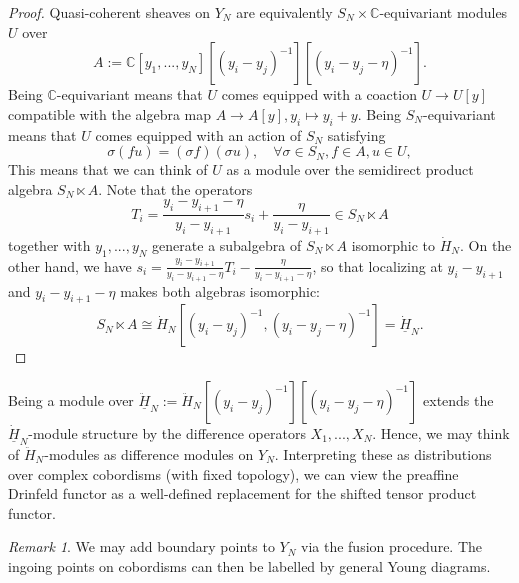 \documentclass[11pt]{report}
\theoremstyle{definition}
\theoremstyle{remark}
\newtheorem*{remark}{Remark}
\theoremstyle{remark}
\newcommand{\C}{\mathbb{C}}
\begin{document}
\begin{proof}
Quasi-coherent sheaves on $Y_N$ are equivalently $S_N \times \C$-equivariant modules $U$ over
\begin{equation*}
A := \C[y_1,...,y_N][(y_i-y_j)^{-1}][(y_i-y_j-\eta)^{-1}].
\end{equation*}
Being $\C$-equivariant means that $U$ comes equipped with a coaction $U \to U[y]$ compatible with the algebra map $A \to A[y], y_i \mapsto y_i+y$. Being $S_N$-equivariant means that $U$ comes equipped with an action of $S_N$ satisfying
\begin{equation*}
\sigma (f u) = (\sigma f) (\sigma u), \quad \forall \sigma \in S_N, f \in A, u \in U,
\end{equation*}
This means that we can think of $U$ as a module over the semidirect product algebra $S_N \ltimes A$. Note that the operators
\begin{equation*}
T_i = \frac{y_i-y_{i+1}-\eta}{y_i-y_{i+1}} s_i + \frac{\eta}{y_i-y_{i+1}} \in S_N \ltimes A
\end{equation*}
together with $y_1,...,y_N$ generate a subalgebra of $S_N \ltimes A$ isomorphic to $\dot H_N$. On the other hand, we have $s_i = \frac{y_i-y_{i+1}}{y_i-y_{i+1}-\eta} T_i - \frac{\eta}{y_i-y_{i+1}-\eta}$, so that localizing at $y_i-y_{i+1}$ and $y_i-y_{i+1}-\eta$ makes both algebras isomorphic:
\begin{equation*}
S_N \ltimes A \cong \dot H_N[(y_i-y_j)^{-1},(y_i-y_j-\eta)^{-1}] = \underline{\dot H}_N.
\end{equation*}
\end{proof}

Being a module over $\underline{\ddot H}_N := \ddot H_N[(y_i-y_j)^{-1}][(y_i-y_j-\eta)^{-1}]$ extends the $\underline{\dot H}_N$-module structure by the difference operators $X_1,...,X_N$. Hence, we may think of $\ddot H_N$-modules as difference modules on $Y_N$. Interpreting these as distributions over complex cobordisms (with fixed topology), we can view the preaffine Drinfeld functor as a well-defined replacement for the shifted tensor product functor.

\begin{remark}
We may add boundary points to $Y_N$ via the fusion procedure. The ingoing points on cobordisms can then be labelled by general Young diagrams.
\end{remark}
\end{document}
